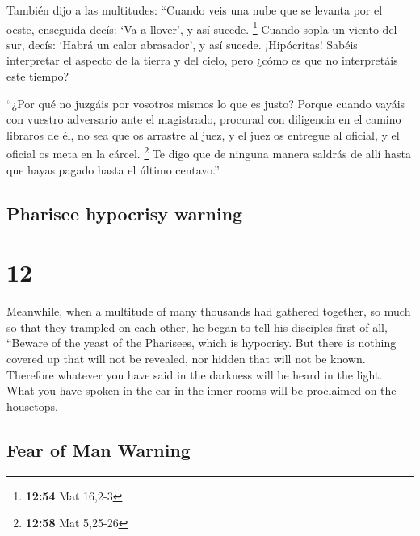 \begin{paracol}{2}
 También dijo a las multitudes: ``Cuando veis una nube
que se levanta por el oeste, enseguida decís: `Va a llover', y así
sucede. \footnote{\textbf{12:54} Mat 16,2-3}  Cuando
sopla un viento del sur, decís: `Habrá un calor abrasador', y así
sucede.  ¡Hipócritas! Sabéis interpretar el aspecto de la
tierra y del cielo, pero ¿cómo es que no interpretáis este tiempo?

 ``¿Por qué no juzgáis por vosotros mismos lo que es
justo?  Porque cuando vayáis con vuestro adversario ante
el magistrado, procurad con diligencia en el camino libraros de él, no
sea que os arrastre al juez, y el juez os entregue al oficial, y el
oficial os meta en la cárcel. \footnote{\textbf{12:58} Mat 5,25-26}
 Te digo que de ninguna manera saldrás de allí hasta que
hayas pagado hasta el último centavo.''

\switchcolumn
\begin{otherlanguage}{english}

\hypertarget{pharisee-hypocrisy-warning}{%
\subsection{Pharisee hypocrisy
warning}\label{pharisee-hypocrisy-warning}}

\hypertarget{section-23}{%
\section{12}\label{section-23}}

 Meanwhile, when a multitude of many thousands had
gathered together, so much so that they trampled on each other, he began
to tell his disciples first of all, ``Beware of the yeast of the
Pharisees, which is hypocrisy.  But there is nothing
covered up that will not be revealed, nor hidden that will not be known.
 Therefore whatever you have said in the darkness will be
heard in the light. What you have spoken in the ear in the inner rooms
will be proclaimed on the housetops.

\hypertarget{fear-of-man-warning}{%
\subsection{Fear of Man Warning}\label{fear-of-man-warning}}


\end{otherlanguage}
\end{paracol}
